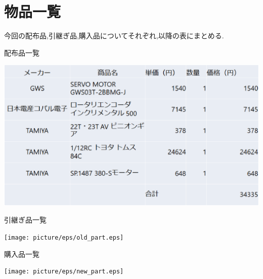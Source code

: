 \section{物品一覧}
今回の配布品,引継ぎ品,購入品についてそれぞれ,以降の表にまとめる.
\begin{table}[h]
	\centering
	\caption{配布品一覧}
	\includegraphics[clip,scale=0.4]{picture/eps/distributed_part.eps}
    \label{distribution}
\end{table}

\begin{table}[h]
	\centering
	\caption{引継ぎ品一覧}
	\texttt{[image: picture/eps/old\_part.eps]}
 \label{old}
\end{table}

\begin{table}[h]
	\centering
	\caption{購入品一覧}
	\texttt{[image: picture/eps/new\_part.eps]}
    \label{new}
\end{table}
